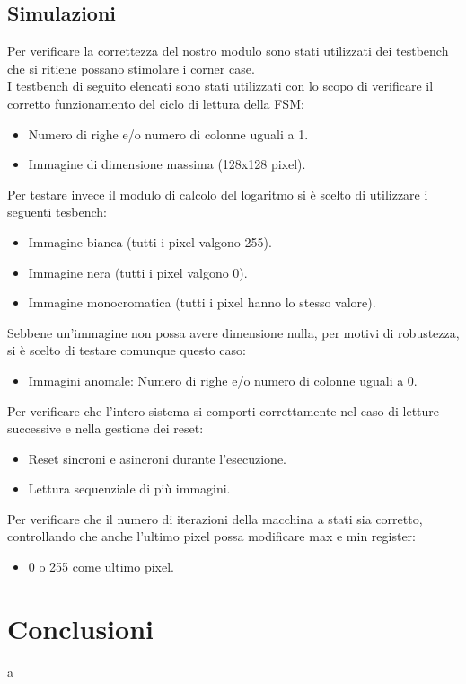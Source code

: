 \documentclass{article}
\begin{document}
\subsection{Simulazioni}
Per verificare la correttezza del nostro modulo sono stati utilizzati dei testbench che si ritiene possano stimolare i corner case.\\
I testbench di seguito elencati sono stati utilizzati con lo scopo di verificare il corretto funzionamento del ciclo di lettura della FSM:
\begin{itemize}
    \item Numero di righe e/o numero di colonne uguali a 1.
    \item Immagine di dimensione massima (128x128 pixel).
\end{itemize}
Per testare invece il modulo di calcolo del logaritmo si è scelto di utilizzare i seguenti tesbench:
\begin{itemize}
    \item Immagine bianca (tutti i pixel valgono 255).
    \item Immagine nera (tutti i pixel valgono 0).
    \item Immagine monocromatica (tutti i pixel hanno lo stesso valore).
\end{itemize}
Sebbene un'immagine non possa avere dimensione nulla, per motivi di robustezza, si è scelto di testare comunque questo caso:
\begin{itemize}
    \item Immagini anomale: Numero di righe e/o numero di colonne uguali a 0.
\end{itemize}
Per verificare che l'intero sistema si comporti correttamente nel caso di letture successive e nella gestione dei reset:
\begin{itemize}
    \item Reset sincroni e asincroni durante l'esecuzione.
\end{itemize}
\begin{itemize}
    \item Lettura sequenziale di più immagini.
\end{itemize}
Per verificare che il numero di iterazioni della macchina a stati sia corretto, controllando che anche l'ultimo pixel possa modificare max e min register:
\begin{itemize}
    \item 0 o 255 come ultimo pixel.
\end{itemize}
\section{Conclusioni}

a


\end{document}
